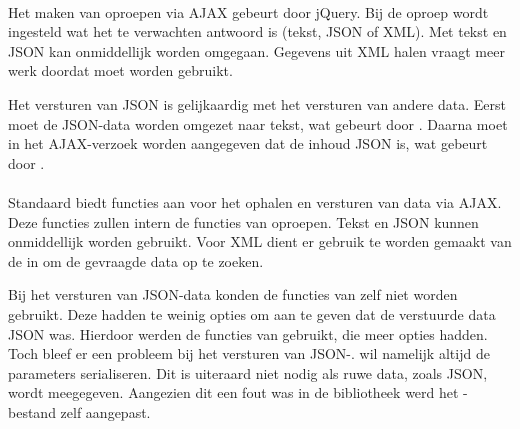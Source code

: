 \paragraph{\jqm}
Het maken van oproepen via AJAX gebeurt door jQuery. 
Bij de oproep wordt ingesteld wat het te verwachten antwoord is (tekst, JSON of XML). 
Met tekst en JSON kan onmiddellijk worden omgegaan.
Gegevens uit XML halen vraagt meer werk doordat  moet worden gebruikt.



Het versturen van JSON is gelijkaardig met het versturen van andere data.
Eerst moet de JSON-data worden omgezet naar tekst, wat gebeurt door .
Daarna moet in het AJAX-verzoek worden aangegeven dat de inhoud JSON is, wat gebeurt door .

\paragraph{\lungo}
Standaard biedt \lungo{} functies aan voor het ophalen en versturen van data via AJAX.
Deze functies zullen intern de functies van \quo{} oproepen.
Tekst en JSON kunnen onmiddellijk worden gebruikt.
Voor XML dient er gebruik te worden gemaakt van de  in \quo{} om de gevraagde data op te zoeken.

Bij het versturen van JSON-data konden de functies van \lungo{} zelf niet worden gebruikt.
Deze hadden te weinig opties om aan te geven dat de verstuurde data JSON was.
Hierdoor werden de functies van \quo{} gebruikt, die meer opties hadden.
Toch bleef er een probleem bij het versturen van JSON-.
\quo{} wil namelijk altijd de parameters serialiseren.
Dit is uiteraard niet nodig als ruwe data, zoals JSON, wordt meegegeven.
Aangezien dit een fout was in de bibliotheek werd het \js-bestand zelf aangepast.

